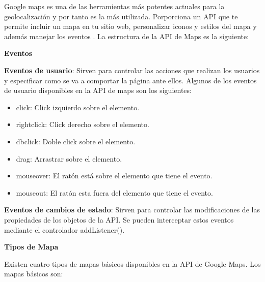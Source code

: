 \vspace{5 mm}

Google maps es una de las herramientas más potentes actuales para la geolocalización y por tanto es la más utilizada. Porporciona un API que te permite incluir un mapa en tu sitio web, personalizar iconos y estilos del mapa y además manejar los eventos \cite{googleMaps-api}. La estructura de la API de Maps es la siguiente:

\vspace{5 mm}

\textbf{Eventos}

\vspace{5 mm}

 \textbf{Eventos de usuario}: Sirven para controlar las acciones que realizan los usuarios y especificar como se va a comportar la página ante ellos. Algunos de los eventos de usuario disponibles en la API de maps son los siguientes:

\begin{itemize}

\item click: Click izquierdo sobre el elemento.

\item rightclick: Click derecho sobre el elemento.

\item dbclick: Doble click sobre el elemento.

\item drag: Arrastrar sobre el elemento.

\item mouseover: El ratón está sobre el elemento que tiene el evento.

\item mouseout: El ratón esta fuera del elemento que tiene el evento.

\end{itemize}

\textbf{Eventos de cambios de estado}: Sirven para controlar las modificaciones de las propiedades de los objetos de la API. Se pueden interceptar estos eventos mediante el controlador addListener().

\vspace{5 mm}

\textbf{Tipos de Mapa}

\vspace{5 mm}

Existen cuatro tipos de mapas básicos disponibles en la API de Google Maps. Los mapas básicos son:

